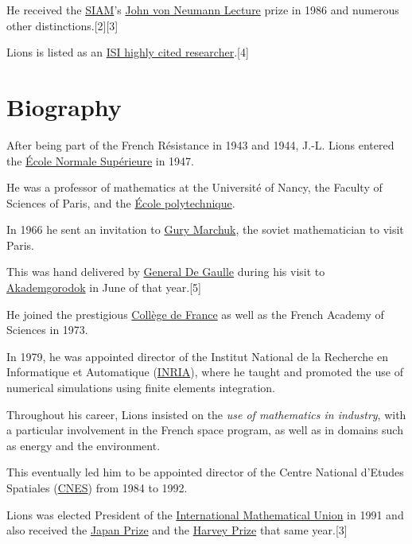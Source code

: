 \documentclass{book}
\numberwithin{equation}{section}
\begin{document}
He received the \href{https://en.wikipedia.org/wiki/Society_for_Industrial_and_Applied_Mathematics}{SIAM}'s \href{https://en.wikipedia.org/wiki/John_von_Neumann_Lecture}{John von Neumann Lecture} prize in 1986 and numerous other distinctions.[2][3]

Lions is listed as an \href{https://en.wikipedia.org/wiki/ISI_highly_cited_researcher}{ISI highly cited researcher}.[4] 

\section{Biography}
After being part of the French Résistance in 1943 and 1944, J.-L. Lions entered the \href{https://en.wikipedia.org/wiki/%C3%89cole_Normale_Sup%C3%A9rieure}{École Normale Supérieure} in 1947.
    
He was a professor of mathematics at the Université of Nancy, the Faculty of Sciences of Paris, and the \href{https://en.wikipedia.org/wiki/%C3%89cole_polytechnique}{École polytechnique}.
    
%
In 1966 he sent an invitation to \href{https://en.wikipedia.org/wiki/Gury_Marchuk}{Gury Marchuk}, the soviet mathematician to visit Paris.

This was hand delivered by \href{https://en.wikipedia.org/wiki/General_De_Gaulle}{General De Gaulle} during his visit to \href{https://en.wikipedia.org/wiki/Akademgorodok}{Akademgorodok} in June of that year.[5]

%
He joined the prestigious \href{https://en.wikipedia.org/wiki/Coll%C3%A8ge_de_France}{Collège de France} as well as the French Academy of Sciences in 1973.
    
In 1979, he was appointed director of the Institut National de la Recherche en Informatique et Automatique (\href{https://en.wikipedia.org/wiki/INRIA}{INRIA}), where he taught and promoted the use of numerical simulations using finite elements integration.

Throughout his career, Lions insisted on the \textit{use of mathematics in industry}, with a particular involvement in the French space program, as well as in domains such as energy and the environment.

This eventually led him to be appointed director of the Centre National d'Etudes Spatiales (\href{https://en.wikipedia.org/wiki/CNES}{CNES}) from 1984 to 1992.

%
Lions was elected President of the \href{https://en.wikipedia.org/wiki/International_Mathematical_Union}{International Mathematical Union} in 1991 and also received the \href{https://en.wikipedia.org/wiki/Japan_Prize}{Japan Prize} and the \href{https://en.wikipedia.org/wiki/Harvey_Prize}{Harvey Prize} that same year.[3]
\end{document}
